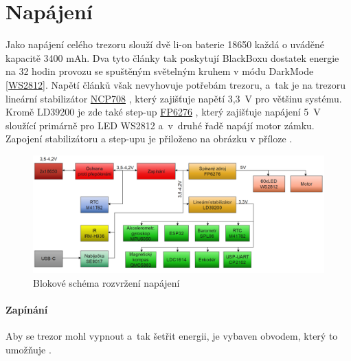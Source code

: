 \section{Napájení}
\label{nabijecka}
Jako napájení celého trezoru slouží dvě li-on baterie 18650 každá o uváděné kapacitě 3400 mAh. 
Dva tyto články tak poskytují BlackBoxu dostatek energie na 32 hodin provozu se spuštěným světelným kruhem v módu DarkMode \ref{WS2812}.
Napětí článků však nevyhovuje potřebám trezoru, a~tak je na trezoru lineární 
stabilizátor \href{https://datasheet.lcsc.com/szlcsc/1808280153_STMicroelectronics-LD39200PU33R_C222192.pdf}{NCP708} \parencite{ld39200}, 
který zajišťuje napětí 3,3~V pro většinu systému. Kromě LD39200 je zde také step-up \href{https://datasheet.lcsc.com/szlcsc/Feeling-Tech-FP6276AXR-G1_C83308.pdf}{FP6276} \parencite{fp6276a}, 
který zajišťuje napájení 5~V sloužící primárně pro LED WS2812 a~v~druhé řadě napájí motor zámku.
Zapojení stabilizátoru a step-upu je přiloženo na obrázku v příloze .

\begin{figure}[h]
    \centering
    \includegraphics[width=\textwidth]{kapitoly/obrazky/E4/napajeni/napajeni.png}
    \caption{Blokové schéma rozvržení napájení}
    \label{fig:E4-napajeni}
\end{figure}

\newpage
\paragraph*{Zapínání}
Aby se trezor mohl vypnout a~tak šetřit energii, je vybaven obvodem, který to umožňuje .


